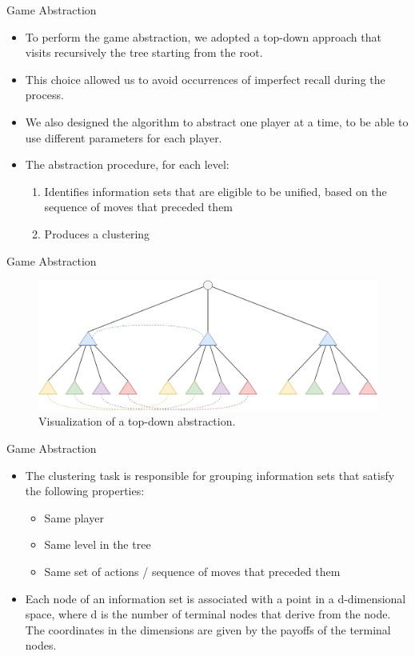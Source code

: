 \documentclass[11pt]{beamer}
\begin{document}
\begin{frame}{Game Abstraction}
\begin{itemize}
\item To perform the game abstraction, we adopted a top-down approach that visits recursively the tree starting from the root. 
\item This choice allowed us to avoid occurrences of imperfect recall during the process.
\item We also designed the algorithm to abstract one player at a time, to be able to use different parameters for each player.
\item The abstraction procedure, for each level:
\begin{enumerate}
\item Identifies information sets that are eligible to be unified, based on the sequence of moves that preceded them
\item Produces a clustering
\end{enumerate}
\end{itemize}
\end{frame}

\begin{frame}{Game Abstraction}
\begin{figure}[hbtp]
		\centering
		\includegraphics[scale=0.2]{images/img_04.png}
		\caption{Visualization of a top-down abstraction.}
\end{figure}
\end{frame}

\begin{frame}{Game Abstraction}
\begin{itemize}
\item The clustering task is responsible for grouping information sets that satisfy the following properties:
\begin{itemize}
\item Same player
\item Same level in the tree
\item Same set of actions / sequence of moves that preceded them
\end{itemize}
\item Each node of an information set is associated with a point in a d-dimensional space, where d is the number of terminal nodes that derive from the node. The coordinates in the dimensions are given by the payoffs of the terminal nodes.
\end{itemize}
\end{frame}
\end{document}
